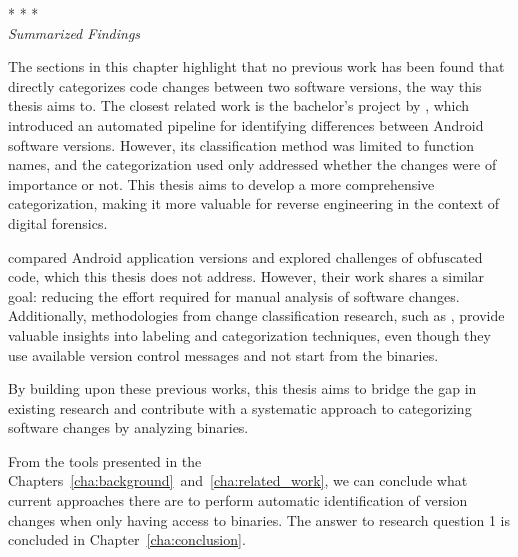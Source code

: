 \begin{center}
    * * *\\
    \Large\textit{Summarized Findings}
\end{center}

\noindent
The sections in this chapter highlight that no previous work has been found that directly categorizes code changes between two software versions, the way this thesis aims to. The closest related work is the bachelor's project by \textcite{nfc_kandidatrapport_jesper}, which introduced an automated pipeline for identifying differences between Android software versions. However, its classification method was limited to function names, and the categorization used only addressed whether the changes were of importance or not. This thesis aims to develop a more comprehensive categorization, making it more valuable for reverse engineering in the context of digital forensics.

 \textcite{android_matching} compared Android application versions and explored challenges of obfuscated code, which this thesis does not address. However, their work shares a similar goal: reducing the effort required for manual analysis of software changes. Additionally, methodologies from change classification research, such as \textcite{classification_of_change_messages}, provide valuable insights into labeling and categorization techniques, even though they use available version control messages and not start from the binaries.

By building upon these previous works, this thesis aims to bridge the gap in existing research and contribute with a systematic approach to categorizing software changes by analyzing binaries.

\begin{rqs}
    From the tools presented in the Chapters~\ref{cha:background}~and~\ref{cha:related_work}, we can conclude what
    current approaches there are to perform automatic identification of version changes when
    only having access to binaries. The answer to research question 1 is concluded in Chapter~\ref{cha:conclusion}.
\end{rqs}
